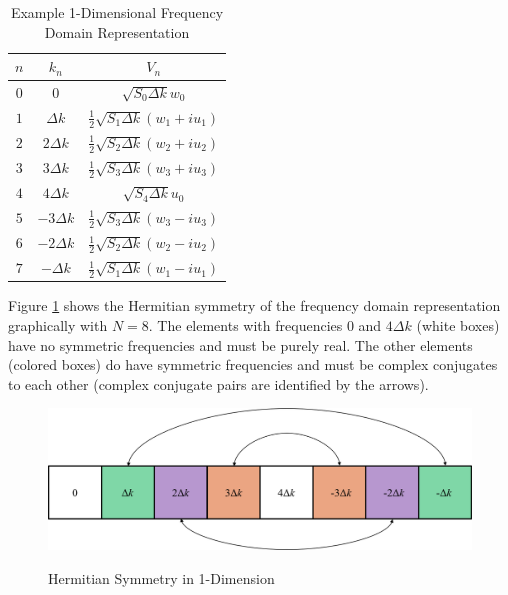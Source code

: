 \begin{table}[ht]
  \begin{center}
      \renewcommand{\baselinestretch}{1} \small\normalsize
  \begin{quote}
    \caption[Example 1-Dimensional Frequency Domain Representation]{Example 1-Dimensional Frequency Domain Representation\label{os_tab:2a}}
  \end{quote}
  \begin{supertabular} {| c | c | c |}
    \hline
  \bf{$n$} & \bf{$k_n$} & \bf{$V_n$} \\ \hline
  $0$ & $0$ & $\sqrt{S_{0} \Delta k}w_0$ \\ \hline
  $1$ & $\Delta k$ & $\frac{1}{2}\sqrt{S_1 \Delta k} \left(w_1 + iu_1 \right)$ \\ \hline
  $2$ & $2\Delta k$ & $\frac{1}{2}\sqrt{S_2\Delta k} \left(w_2 + iu_2 \right)$ \\ \hline
  $3$ & $3\Delta k$ & $\frac{1}{2}\sqrt{S_3 \Delta k} \left(w_3 + iu_3 \right)$ \\ \hline
  $4$ & $4\Delta k$ & $\sqrt{S_{4} \Delta k} u_0$ \\ \hline
  $5$ & $-3\Delta k$ & $\frac{1}{2}\sqrt{S_3 \Delta k} \left(w_3 - iu_3 \right)$ \\ \hline
  $6$ & $-2\Delta k$ & $\frac{1}{2}\sqrt{S_2 \Delta k} \left(w_2 - iu_2 \right)$  \\ \hline
  $7$ & $-\Delta k$ & $\frac{1}{2}\sqrt{S_1 \Delta k} \left(w_1 - iu_1 \right)$ \\ \hline
\end{supertabular}
\end{center}
\end{table}
\renewcommand{\baselinestretch}{2} \small\normalsize

Figure \ref{os_fig:6ab} shows the Hermitian symmetry of the frequency domain representation graphically with $N = 8$. The elements with frequencies $0$ and $4\Delta k$ (white boxes) have no symmetric frequencies and must be purely real. The other elements (colored boxes) do have symmetric frequencies and must be complex conjugates to each other (complex conjugate pairs are identified by the arrows).

\begin{figure}[ht]
  \begin{center}
\includegraphics[width=5in]{../media/Ocean_Surface/1-d_hermitian_symmetry.png}
  \end{center}
  \renewcommand{\baselinestretch}{1} \small\normalsize
  \begin{quote}
    \caption[Hermitian Symmetry in 1-Dimension]{Hermitian Symmetry in 1-Dimension\label{os_fig:6ab}}
  \end{quote}
\end{figure}
\renewcommand{\baselinestretch}{2} \small\normalsize

